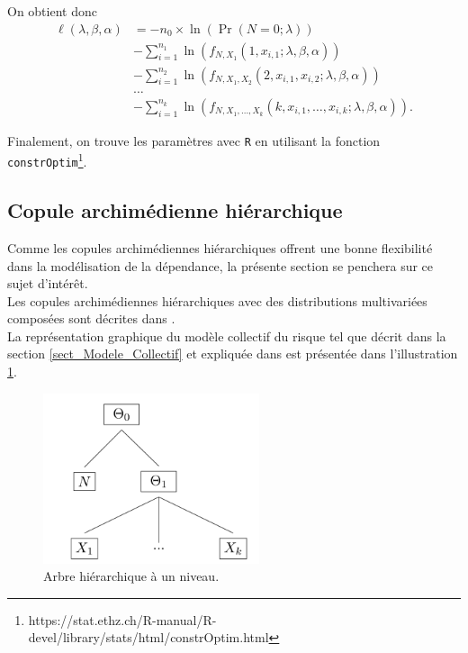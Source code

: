 \documentclass{article}
\renewcommand{\figurename}{Illustration}
\begin{document}
		On obtient donc
		\begin{align}
		\ell(\lambda, \beta, \alpha) 
		&=  - n_0 \times \ln \left( \Pr (N=0 ; \lambda) \right) \nonumber\\
		& - \sum_{i=1}^{n_1} \ln \left(f_{N,X_1}(1,x_{i,1};\lambda,\beta, \alpha) \right) \nonumber \\
		& - \sum_{i=1}^{n_2} \ln \left(f_{N,X_1,X_2}(2,x_{i,1},x_{i,2};\lambda,\beta, \alpha)\right) \label{logLikelyhood_neg} \\
		& \dots \nonumber\\
		& - \sum_{i=1}^{n_k} \ln \left( f_{N,X_1,\dots,X_k}(k,x_{i,1},\dots,x_{i,k};\lambda,\beta, \alpha)\right). \nonumber
		\end{align}
		
		Finalement, on trouve les paramètres avec \texttt{R} en utilisant la fonction \texttt{constrOptim}\footnote{https://stat.ethz.ch/R-manual/R-devel/library/stats/html/constrOptim.html}.
		

	\subsection{Copule archimédienne hiérarchique}	
	Comme les copules archimédiennes hiérarchiques offrent une bonne flexibilité dans la modélisation de la dépendance, la présente section se penchera sur ce sujet d'intérêt.\\
	
	Les copules archimédiennes hiérarchiques avec des distributions multivariées composées sont décrites dans \cite{Itre4}.\\
	La représentation graphique du modèle collectif du risque tel que décrit dans la section \ref{sect_Modele_Collectif} et expliquée dans \cite{Itre5} est présentée dans l'illustration \ref{graph_hierarchie}.
	
	\begin{figure}[H]
		\centering
		\includegraphics[height=5cm]{Hierarchie}
		\renewcommand{\figurename}{Illustration}
		\caption{Arbre hiérarchique à un niveau.} \label{graph_hierarchie}
	\end{figure}
\end{document}

